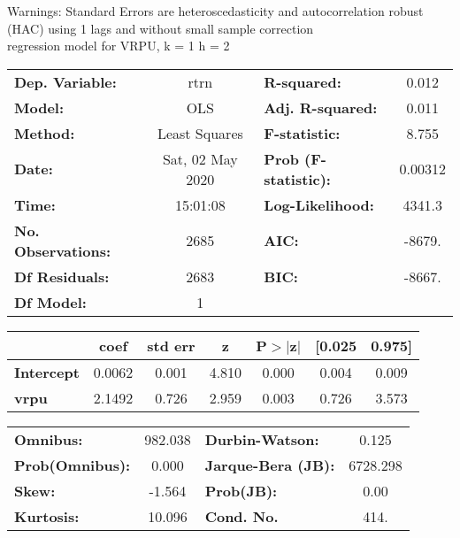 Warnings: \newline
 [1] Standard Errors are heteroscedasticity and autocorrelation robust (HAC) using 1 lags and without small sample correction\\ 

regression model for VRPU, k = 1 h = 2\begin{center}
\begin{tabular}{lclc}
\toprule
\textbf{Dep. Variable:}    &       rtrn       & \textbf{  R-squared:         } &     0.012   \\
\textbf{Model:}            &       OLS        & \textbf{  Adj. R-squared:    } &     0.011   \\
\textbf{Method:}           &  Least Squares   & \textbf{  F-statistic:       } &     8.755   \\
\textbf{Date:}             & Sat, 02 May 2020 & \textbf{  Prob (F-statistic):} &  0.00312    \\
\textbf{Time:}             &     15:01:08     & \textbf{  Log-Likelihood:    } &    4341.3   \\
\textbf{No. Observations:} &        2685      & \textbf{  AIC:               } &    -8679.   \\
\textbf{Df Residuals:}     &        2683      & \textbf{  BIC:               } &    -8667.   \\
\textbf{Df Model:}         &           1      & \textbf{                     } &             \\
\bottomrule
\end{tabular}
\begin{tabular}{lcccccc}
                   & \textbf{coef} & \textbf{std err} & \textbf{z} & \textbf{P$> |$z$|$} & \textbf{[0.025} & \textbf{0.975]}  \\
\midrule
\textbf{Intercept} &       0.0062  &        0.001     &     4.810  &         0.000        &        0.004    &        0.009     \\
\textbf{vrpu}      &       2.1492  &        0.726     &     2.959  &         0.003        &        0.726    &        3.573     \\
\bottomrule
\end{tabular}
\begin{tabular}{lclc}
\textbf{Omnibus:}       & 982.038 & \textbf{  Durbin-Watson:     } &    0.125  \\
\textbf{Prob(Omnibus):} &   0.000 & \textbf{  Jarque-Bera (JB):  } & 6728.298  \\
\textbf{Skew:}          &  -1.564 & \textbf{  Prob(JB):          } &     0.00  \\
\textbf{Kurtosis:}      &  10.096 & \textbf{  Cond. No.          } &     414.  \\
\bottomrule
\end{tabular}
\end{center}

